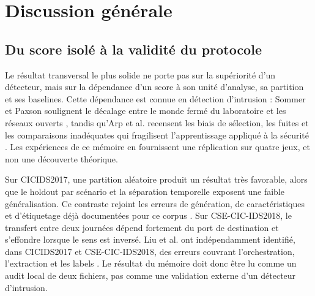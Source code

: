 
\chapter{Discussion générale}

\section{Du score isolé à la validité du protocole}

Le résultat transversal le plus solide ne porte pas sur la supériorité d'un détecteur,
mais sur la dépendance d'un score à son unité d'analyse, sa partition et ses baselines.
Cette dépendance est connue en détection d'intrusion : Sommer et Paxson soulignent le
décalage entre le monde fermé du laboratoire et les réseaux ouverts
\cite{sommer2010outside}, tandis qu'Arp et al. recensent les biais de sélection, les
fuites et les comparaisons inadéquates qui fragilisent l'apprentissage appliqué à la
sécurité \cite{arp2022dos}. Les expériences de ce mémoire en fournissent une réplication
sur quatre jeux, et non une découverte théorique.

Sur CICIDS2017, une partition aléatoire produit un résultat très favorable, alors que le
holdout par scénario et la séparation temporelle exposent une faible généralisation. Ce
contraste rejoint les erreurs de génération, de caractéristiques et d'étiquetage déjà
documentées pour ce corpus \cite{engelen2021troubleshooting,lanvin2023errors}. Sur
CSE-CIC-IDS2018, le transfert entre deux journées dépend fortement du port de destination
et s'effondre lorsque le sens est inversé. Liu et al. ont indépendamment identifié, dans
CICIDS2017 et CSE-CIC-IDS2018, des erreurs couvrant l'orchestration, l'extraction et les
labels \cite{liu2022error}. Le résultat du mémoire doit donc être lu comme un audit local
de deux fichiers, pas comme une validation externe d'un détecteur d'intrusion.

